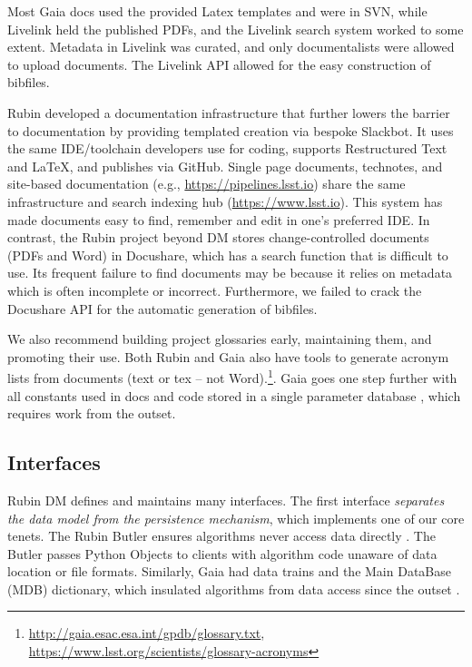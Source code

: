 \documentclass[11pt,twoside]{article}
\begin{document}
Most Gaia docs used the provided Latex templates and were in SVN, while Livelink held the published PDFs, and the Livelink search system worked to some extent.
Metadata in Livelink was curated, and only documentalists were allowed to upload documents.
The Livelink API allowed for the easy construction of bibfiles.

Rubin developed a documentation infrastructure that further lowers the barrier to documentation by providing templated creation via bespoke Slackbot. It uses the same IDE/toolchain developers use for coding, supports Restructured Text and \LaTeX, and publishes via GitHub.
Single page documents, technotes, and site-based documentation (e.g., \url{https://pipelines.lsst.io}) share the same infrastructure \citep{SQR-000} and search indexing hub (\url{https://www.lsst.io}).
This system has made documents easy to find, remember and edit in one's preferred IDE.
In contrast, the Rubin project beyond DM stores change-controlled documents (PDFs and Word) in Docushare, which has a search function that is difficult to use.
Its frequent failure to find documents may be because it relies on metadata which is often incomplete or incorrect.  Furthermore, we failed to crack the Docushare API for the automatic generation of bibfiles.

We also recommend building project glossaries early, maintaining them, and promoting their use.
Both Rubin and Gaia also have tools to generate acronym lists from documents (text or tex -- not Word).\footnote{\url{http://gaia.esac.esa.int/gpdb/glossary.txt}, \url{https://www.lsst.org/scientists/glossary-acronyms}}. Gaia goes one step further with all constants used in docs and code stored in a single parameter database \citep{2005ESASP.576...67D}, which requires work from the outset.


\subsection{Interfaces}
Rubin DM defines and maintains many interfaces.
The first interface \emph{separates the data model from the persistence mechanism}, which implements one of our core tenets.
The Rubin Butler ensures algorithms never access data directly \citep{2022SPIE12189E..11J,2019ASPC..523..653J,C24_adassxxxii,P52_adassxxxii}.
The Butler passes Python Objects to clients with algorithm code unaware of data location or file formats.
Similarly, Gaia had data trains and the Main DataBase (MDB) dictionary, which insulated algorithms from data access since the outset \citep{1999BaltA...8...57O}.
\end{document}
